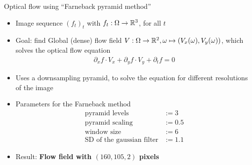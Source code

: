 \begin{frame}{Optical flow using \enquote{Farneback pyramid method}\cite{Farneback2003}}

\begin{itemize}
\item Image sequence $(f_t)_t$ with $f_t : \Omega \to {\mathbb{R}}^3$, for all $t$
\item Goal: find Global (dense) flow field $V : \Omega \to {\mathbb{R}}^2, \omega \mapsto (V_x(\omega), V_y(\omega))$, which solves the optical flow equation
\begin{align*}
\partial_x f \cdot V_x + \partial_y f \cdot  V_y + \partial_t f  = 0
\end{align*}
\item Uses a downsampling pyramid, to solve the equation for different resolutions of the image
\item Parameters for the Farneback method
\begin{align*}
\text{pyramid levels} &:= 3\\
\text{pyramid scaling} &:= 0.5\\
\text{window size} &:= 6\\
\text{SD of the gaussian filter} &:= 1.1
\end{align*}
\item Result: \textbf{Flow field with $(160,105,2)$ pixels}
\end{itemize}
\end{frame}

